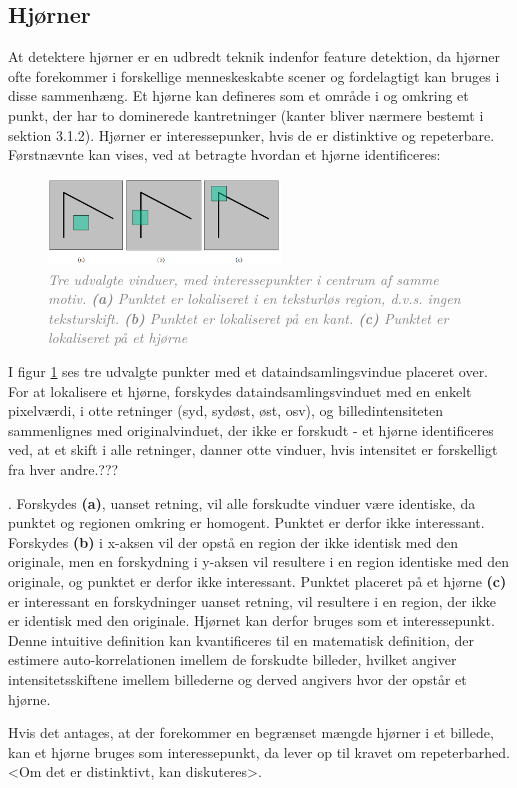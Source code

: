 \subsection{Hjørner}\label{subsec:corner}
At detektere hjørner er en udbredt teknik indenfor feature detektion, da hjørner ofte forekommer i forskellige menneskeskabte scener og fordelagtigt kan bruges i disse sammenhæng. Et hjørne kan defineres som et område i og omkring et punkt, der har to dominerede kantretninger (kanter bliver nærmere bestemt i sektion 3.1.2). Hjørner er interessepunker, hvis de er distinktive og repeterbare. Førstnævnte kan vises, ved at betragte hvordan et hjørne identificeres:
\begin{figure}[H]
    \centering
    \includegraphics[width=0.55\textwidth]{fig/6.png}
    \vspace{-1em}   
    \begin{center}    
    \caption{\textcolor{gray}{\footnotesize \textit{
     Tre udvalgte vinduer, med interessepunkter i centrum af samme motiv. \textbf{(a)} Punktet er lokaliseret i en teksturløs region, d.v.s. ingen teksturskift. \textbf{(b)} Punktet er lokaliseret på en kant. \textbf{(c)} Punktet er lokaliseret på et hjørne }}}
    \label{fig:2}
     \end{center}
    \vspace{-2.7em}  
  \end{figure}  
\noindent
I figur \ref{fig:2} ses tre udvalgte punkter med et dataindsamlingsvindue placeret over. For at lokalisere et hjørne, forskydes dataindsamlingsvinduet med en enkelt pixelværdi, i otte retninger (syd, sydøst, øst, osv), og billedintensiteten sammenlignes med originalvinduet, der ikke er forskudt - et hjørne identificeres ved, at et skift i alle retninger, danner otte vinduer, hvis intensitet er forskelligt fra hver andre.???

. Forskydes  \textbf{(a)}, uanset retning, vil alle forskudte vinduer være identiske, da punktet og regionen omkring er homogent. Punktet er derfor ikke interessant. Forskydes \textbf{(b)} i x-aksen vil der opstå en region der ikke identisk med den originale, men en forskydning i y-aksen vil resultere i en region identiske med den originale, og punktet er derfor ikke interessant. Punktet placeret på et hjørne \textbf{(c)} er interessant en forskydninger uanset retning, vil resultere i en region, der ikke er identisk med den originale. Hjørnet kan derfor bruges som et interessepunkt. Denne intuitive definition kan kvantificeres til en matematisk definition, der estimere auto-korrelationen imellem de forskudte billeder, hvilket angiver intensitetsskiftene imellem billederne og derved angivers hvor der opstår et hjørne.


Hvis det antages, at der forekommer en begrænset mængde hjørner i et billede, kan et hjørne bruges som interessepunkt, da lever op til kravet om repeterbarhed. <Om det er distinktivt, kan diskuteres>.